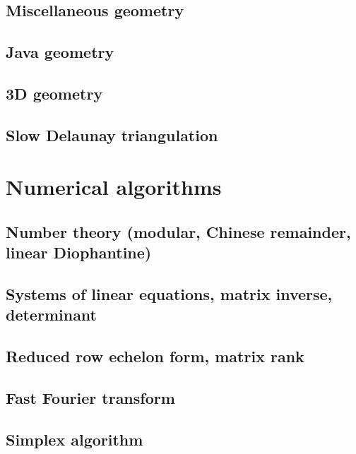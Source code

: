 \documentclass[twocolumn]{article}
\begin{document}
\begin{landscape}
\subsection{Miscellaneous geometry}
\raggedbottom
\subsection{Java geometry}
\raggedbottom
\subsection{3D geometry}
\raggedbottom
\subsection{Slow Delaunay triangulation}
\raggedbottom

\section{Numerical algorithms}
\subsection{Number theory (modular, Chinese remainder, linear Diophantine)}
\raggedbottom
\subsection{Systems of linear equations, matrix inverse, determinant}
\raggedbottom
\subsection{Reduced row echelon form, matrix rank}
\raggedbottom
\subsection{Fast Fourier transform}
\raggedbottom
\subsection{Simplex algorithm}
\raggedbottom


\end{landscape}
\end{document}
